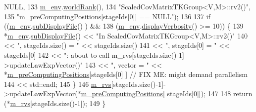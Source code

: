 \begin{DoxyCode}
      NULL,
133                       \hyperlink{class_q_u_e_s_o_1_1_base_t_k_group_a2bce5e8aa5c844d4332a0e73cf00a1f9}{m\_env}.\hyperlink{class_q_u_e_s_o_1_1_base_environment_a78b57112bbd0e6dd0e8afec00b40ffa7}{worldRank}(),
134                       \textcolor{stringliteral}{"ScaledCovMatrixTKGroup<V,M>::rv2()"},
135                       \textcolor{stringliteral}{"m\_preComputingPositions[stageIds[0]] == NULL"});
136 
137   \textcolor{keywordflow}{if} ((\hyperlink{class_q_u_e_s_o_1_1_base_t_k_group_a2bce5e8aa5c844d4332a0e73cf00a1f9}{m\_env}.\hyperlink{class_q_u_e_s_o_1_1_base_environment_a8a0064746ae8dddfece4229b9ad374d6}{subDisplayFile}()        ) &&
138       (\hyperlink{class_q_u_e_s_o_1_1_base_t_k_group_a2bce5e8aa5c844d4332a0e73cf00a1f9}{m\_env}.\hyperlink{class_q_u_e_s_o_1_1_base_environment_a1fe5f244fc0316a0ab3e37463f108b96}{displayVerbosity}() >= 10)) \{
139     *\hyperlink{class_q_u_e_s_o_1_1_base_t_k_group_a2bce5e8aa5c844d4332a0e73cf00a1f9}{m\_env}.\hyperlink{class_q_u_e_s_o_1_1_base_environment_a8a0064746ae8dddfece4229b9ad374d6}{subDisplayFile}() << \textcolor{stringliteral}{"In ScaledCovMatrixTKGroup<V,M>::rv2()"}
140                             << \textcolor{stringliteral}{", stageIds.size() = "} << stageIds.size()
141                             << \textcolor{stringliteral}{", stageIds[0] = "}     << stageIds[0]
142                             << \textcolor{stringliteral}{": about to call m\_rvs[stageIds.size()-1]->updateLawExpVector()"}
143                             << \textcolor{stringliteral}{", vector = "} << *\hyperlink{class_q_u_e_s_o_1_1_base_t_k_group_a93d7fe55e30a7c6f209b01cb8a67e322}{m\_preComputingPositions}[stageIds[0]
      ] \textcolor{comment}{// FIX ME: might demand parallelism}
144                             << std::endl;
145   \}
146   \hyperlink{class_q_u_e_s_o_1_1_base_t_k_group_a87c6b02ea45ab3de634c22afa58f53a5}{m\_rvs}[stageIds.size()-1]->updateLawExpVector(*\hyperlink{class_q_u_e_s_o_1_1_base_t_k_group_a93d7fe55e30a7c6f209b01cb8a67e322}{m\_preComputingPositions}[
      stageIds[0]]);
147 
148   \textcolor{keywordflow}{return} (*\hyperlink{class_q_u_e_s_o_1_1_base_t_k_group_a87c6b02ea45ab3de634c22afa58f53a5}{m\_rvs}[stageIds.size()-1]);
149 \}
\end{DoxyCode}
